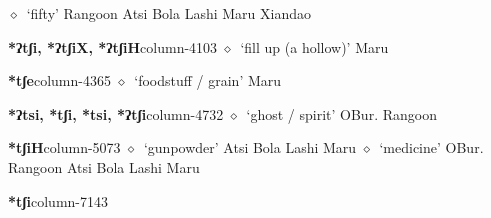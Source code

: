          $\diamond$~`fifty'
         Rangoon 
\hspace{1ex}
         Atsi 
\hspace{1ex}
         Bola 
\hspace{1ex}
         Lashi 
\hspace{1ex}
         Maru 
\hspace{1ex}
         Xiandao 
  \item {\footnotesize \textbf{*ʔtʃi, *ʔtʃiX, *ʔtʃiH}}{\tiny column-4103}
         $\diamond$~`fill up (a hollow)'
         Maru 
  \item {\footnotesize \textbf{*tʃe}}{\tiny column-4365}
         $\diamond$~`foodstuff / grain'
         Maru 
  \item {\footnotesize \textbf{*ʔtsi, *tʃi, *tsi, *ʔtʃi}}{\tiny column-4732}
         $\diamond$~`ghost / spirit'
         OBur. 
\hspace{1ex}
         Rangoon 
  \item {\footnotesize \textbf{*tʃiH}}{\tiny column-5073}
         $\diamond$~`gunpowder'
         Atsi 
\hspace{1ex}
         Bola 
\hspace{1ex}
         Lashi 
\hspace{1ex}
         Maru 
\hspace{1ex}
         $\diamond$~`medicine'
         OBur. 
\hspace{1ex}
         Rangoon 
\hspace{1ex}
         Atsi 
\hspace{1ex}
         Bola 
\hspace{1ex}
         Lashi 
\hspace{1ex}
         Maru 
  \item {\footnotesize \textbf{*tʃi}}{\tiny column-7143}
